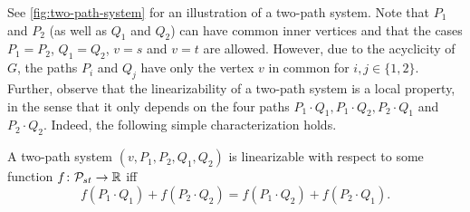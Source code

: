 See \cref{fig:two-path-system} for an illustration of a two-path system. 
Note that $P_1$ and $P_2$ (as well as $Q_1$ and $Q_2$) can have common inner vertices and that the cases $P_1=P_2$, $Q_1=Q_2$, $v = s$ and $v = t$ are allowed. 
However, due to the acyclicity of $G$, the paths $P_i$ and $Q_j$ have only the vertex $v$ in common for $i,j \in\{1,2\}$. Further, observe that the linearizability of a two-path system 
is a local property, in the sense  that it only   depends on the four paths $P_1 \cdot Q_1, P_1 \cdot Q_2, P_2 \cdot Q_1$ and $P_2 \cdot Q_2$. Indeed,  the following simple characterization holds. 

\begin{proposition}
\label{obs:linearizability-two-paths}
A two-path system $(v,P_1,P_2,Q_1,Q_2)$ is linearizable with respect to some function $f\colon \mathcal{P}_{st}\to \mathbb{R}$ iff
\begin{equation}
f(P_1 \cdot Q_1) + f(P_2 \cdot Q_2) = f(P_1 \cdot Q_2) + f(P_2 \cdot Q_1).    \label{eq:two-path-lin}
\end{equation}
\end{proposition}

